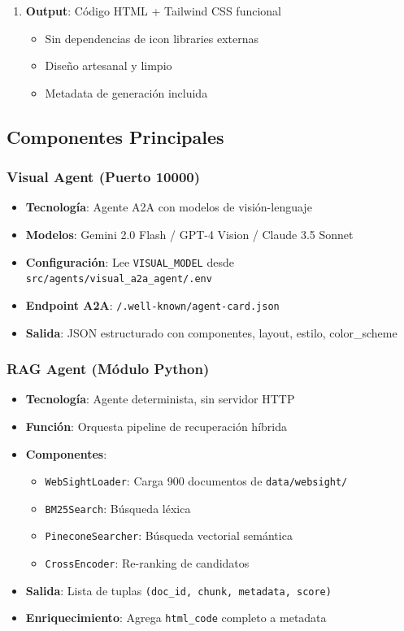 \documentclass[12pt,a4paper]{article}
\begin{document}
\begin{enumerate}
    \item \textbf{Output}: Código HTML + Tailwind CSS funcional
    \begin{itemize}
        \item Sin dependencias de icon libraries externas
        \item Diseño artesanal y limpio
        \item Metadata de generación incluida
    \end{itemize}
\end{enumerate}

\subsection{Componentes Principales}

\subsubsection{Visual Agent (Puerto 10000)}
\begin{itemize}
    \item \textbf{Tecnología}: Agente A2A con modelos de visión-lenguaje
    \item \textbf{Modelos}: Gemini 2.0 Flash / GPT-4 Vision / Claude 3.5 Sonnet
    \item \textbf{Configuración}: Lee \texttt{VISUAL\_MODEL} desde \texttt{src/agents/visual\_a2a\_agent/.env}
    \item \textbf{Endpoint A2A}: \texttt{/.well-known/agent-card.json}
    \item \textbf{Salida}: JSON estructurado con componentes, layout, estilo, color\_scheme
\end{itemize}

\subsubsection{RAG Agent (Módulo Python)}
\begin{itemize}
    \item \textbf{Tecnología}: Agente determinista, sin servidor HTTP
    \item \textbf{Función}: Orquesta pipeline de recuperación híbrida
    \item \textbf{Componentes}:
    \begin{itemize}
        \item \texttt{WebSightLoader}: Carga 900 documentos de \texttt{data/websight/}
        \item \texttt{BM25Search}: Búsqueda léxica
        \item \texttt{PineconeSearcher}: Búsqueda vectorial semántica
        \item \texttt{CrossEncoder}: Re-ranking de candidatos
    \end{itemize}
    \item \textbf{Salida}: Lista de tuplas \texttt{(doc\_id, chunk, metadata, score)}
    \item \textbf{Enriquecimiento}: Agrega \texttt{html\_code} completo a metadata
\end{itemize}
\end{document}
